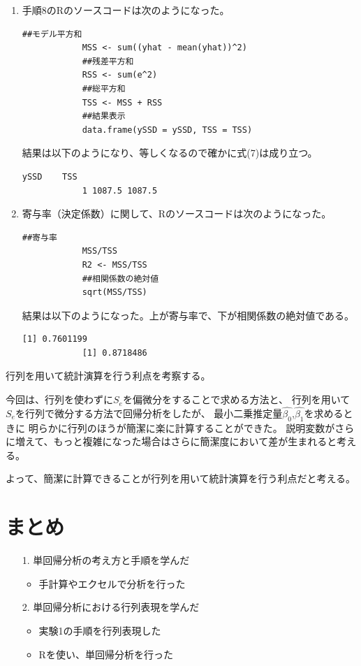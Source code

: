 \documentclass[12pt]{jarticle}
\begin{document}
\begin{enumerate}
          \clearpage

    \item 手順8のRのソースコードは次のようになった。
          \begin{lstlisting}[style = lstR]
            ##モデル平方和
            MSS <- sum((yhat - mean(yhat))^2)
            ##残差平方和
            RSS <- sum(e^2)
            ##総平方和
            TSS <- MSS + RSS
            ##結果表示
            data.frame(ySSD = ySSD, TSS = TSS)
\end{lstlisting}
          結果は以下のようになり、等しくなるので確かに式(7)は成り立つ。
          \begin{lstlisting}[style=log]
                ySSD    TSS
            1 1087.5 1087.5
\end{lstlisting}
    \item 寄与率（決定係数）に関して、Rのソースコードは次のようになった。
          \begin{lstlisting}[style = lstR]
            ##寄与率
            MSS/TSS
            R2 <- MSS/TSS
            ##相関係数の絶対値
            sqrt(MSS/TSS)
\end{lstlisting}
          結果は以下のようになった。上が寄与率で、下が相関係数の絶対値である。
          \begin{lstlisting}[style=log]
            [1] 0.7601199
            [1] 0.8718486
\end{lstlisting}
\end{enumerate}

\begin{shadebox}
    行列を用いて統計演算を行う利点を考察する。
\end{shadebox}
今回は、行列を使わずに$S_e$を偏微分をすることで求める方法と、
行列を用いて$S_e$を行列で微分する方法で回帰分析をしたが、
最小二乗推定量$\hat{\beta_0}$,$\hat{\beta_1}$を求めるときに
明らかに行列のほうが簡潔に楽に計算することができた。
説明変数がさらに増えて、もっと複雑になった場合はさらに簡潔度において差が生まれると考える。

よって、簡潔に計算できることが行列を用いて統計演算を行う利点だと考える。

\section{まとめ}
\begin{itemize}
    \item [1.]単回帰分析の考え方と手順を学んだ
          \begin{itemize}
              \item 手計算やエクセルで分析を行った
          \end{itemize}
    \item [2.]単回帰分析における行列表現を学んだ
          \begin{itemize}
              \item 実験1の手順を行列表現した
              \item Rを使い、単回帰分析を行った
          \end{itemize}
\end{itemize}
\end{document}
